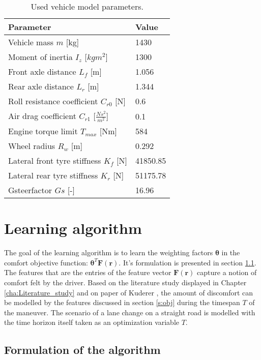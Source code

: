 \begin{table}[h]
	\centering
	\begin{tabular}{|p{5cm}|p{2cm}|}
		\hline
		\textbf{Parameter} & \textbf{Value}\\ \hline	
		Vehicle mass $m$ [kg] & 1430\\ \hline
		Moment of inertia $I_z$ [$kgm^2$] & 1300\\ \hline
		Front axle distance $L_f$ [m] & 1.056\\ \hline
		Rear axle distance $L_r$ [m] & 1.344\\ \hline
		Roll resistance coefficient $C_{r0}$ [N] & 0.6\\ \hline
		Air drag coefficient $C_{r1}$ [$\frac{Ns^2}{m^2}$] & 0.1\\ \hline
		Engine torque limit $T_{max}$ [Nm] & 584\\ \hline
		Wheel radius $R_w$ [m] & 0.292\\ \hline
		Lateral front tyre stiffness $K_{f}$ [N] & 41850.85\\ \hline
		Lateral rear tyre stiffness $K_{r}$ [N] & 51175.78\\ \hline
		Gsteerfactor $Gs$ [-] &16.96 \\ \hline
		
	\end{tabular}
	\caption{Used vehicle model parameters.}
	\label{table:vehicel_model_param}
\end{table}
\newpage
\section{Learning algorithm} 
\label{s:learning_alg}
The goal of the learning algorithm is to learn the weighting factors $\bm{\theta}$ in the comfort objective function: $\bm{\theta}^T\bm{F}(\bm{r})$. It's formulation is presented in section \ref{s:flow alg}. The features that are the entries of the feature vector $\bm{F}(\bm{r})$ capture a notion of comfort felt by the driver. Based on the literature study displayed in Chapter \ref{cha:Literature_study} and on paper of Kuderer \cite{Kuderer2015a}, the amount of discomfort can be modelled by the features discussed in section \ref{s:obj} during the timespan $T$ of the maneuver. The scenario of a lane change on a straight road is modelled with the time horizon itself taken as an optimization variable $T$.


\subsection{Formulation of the algorithm}\label{s:flow alg}

